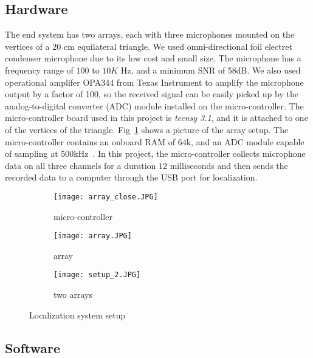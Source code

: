 \subsection{Hardware}
The end system has two arrays, each with three microphones mounted on the vertices of a $20$ cm equilateral triangle. We used omni-directional foil electret condenser microphone due to its low cost and small size. The microphone has a frequency range of $100$ to $10K$ Hz, and a minimum SNR of 58dB\cite{sys:1}. We also used operational amplifer OPA344 from Texas Instrument to amplify the microphone output by a factor of 100, so the received signal can be easily picked up by the analog-to-digital converter (ADC) module installed on the micro-controller. The micro-controller board used in this project is \emph{teensy 3.1}, and it is attached to one of the vertices of the triangle. Fig~\ref{fig:setup_array} shows a picture of the array setup.  The micro-controller contains an onboard RAM of $64$k, and an ADC module capable of sampling at $500$kHz~\cite{tdoa:micloc, sys:teensy, sys:teensy2}. In this project, the micro-controller collects microphone data on all three channels for a duration $12$ milliseconds and then sends the recorded data to a computer through the USB port for localization. 

\begin{figure}[h!]
  \centering
  \begin{subfigure}[]{.48\textwidth}
    \texttt{[image: array\_close.JPG]}
    \caption{micro-controller}
  \end{subfigure}
  \begin{subfigure}[]{.48\textwidth}
    \texttt{[image: array.JPG]}
    \caption{array}
  \end{subfigure}
  \begin{subfigure}[]{.48\textwidth}
    \texttt{[image: setup\_2.JPG]}
    \caption{two arrays}
  \end{subfigure}
  \caption{Localization system setup}
  \label{fig:setup_array}
\end{figure}

\subsection{Software}

